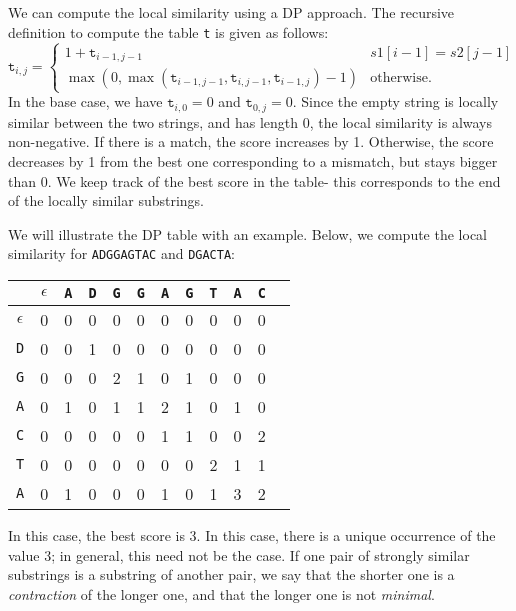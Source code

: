 \documentclass[a4paper, openany]{memoir}
\begin{document}
    We can compute the local similarity using a DP approach. The recursive definition to compute the table \texttt{t} is given as follows:
    \[\texttt{t}_{i, j} = \begin{cases}
        1 + \texttt{t}_{i-1, j-1} & s1[i-1] = s2[j-1] \\
        \max(0, \max(\texttt{t}_{i-1, j-1}, \texttt{t}_{i, j-1}, \texttt{t}_{i-1, j}) - 1) & \text{otherwise}.
    \end{cases}\]
    In the base case, we have $\texttt{t}_{i, 0} = 0$ and $\texttt{t}_{0, j} = 0$. Since the empty string is locally similar between the two strings, and has length 0, the local similarity is always non-negative. If there is a match, the score increases by 1. Otherwise, the score decreases by 1 from the best one corresponding to a mismatch, but stays bigger than 0. We keep track of the best score in the table- this corresponds to the end of the locally similar substrings.


    We will illustrate the DP table with an example. Below, we compute the local similarity for \texttt{ADGGAGTAC} and \texttt{DGACTA}:
    \begin{table}[H]
        \centering
        \begin{tabular}{c|ccccccccccc}
            & $\epsilon$ & \texttt{A} & \texttt{D} & \texttt{G} & \texttt{G} & \texttt{A} & \texttt{G} & \texttt{T} & \texttt{A} & \texttt{C} \\
            \hline
            $\epsilon$ & 0 & 0 & 0 & 0 & 0 & 0 & 0 & 0 & 0 & 0 \\
            \texttt{D} & 0 & 0 & 1 & 0 & 0 & 0 & 0 & 0 & 0 & 0 \\
            \texttt{G} & 0 & 0 & 0 & 2 & 1 & 0 & 1 & 0 & 0 & 0 \\
            \texttt{A}& 0 & 1 & 0 & 1 & 1 & 2 & 1 & 0 & 1 & 0 \\
            \texttt{C} & 0 & 0 & 0 & 0 & 0 & 1 & 1 & 0 & 0 & 2 \\
            \texttt{T} & 0 & 0 & 0 & 0 & 0 & 0 & 0 & 2 & 1 & 1 \\
            \texttt{A} & 0 & 1 & 0 & 0 & 0 & 1 & 0 & 1 & {\color{red} 3} & 2
        \end{tabular}
    \end{table}
    \noindent In this case, the best score is 3. In this case, there is a unique occurrence of the value 3; in general, this need not be the case. If one pair of strongly similar substrings is a substring of another pair, we say that the shorter one is a \emph{contraction} of the longer one, and that the longer one is not \emph{minimal}.
    
\end{document}
